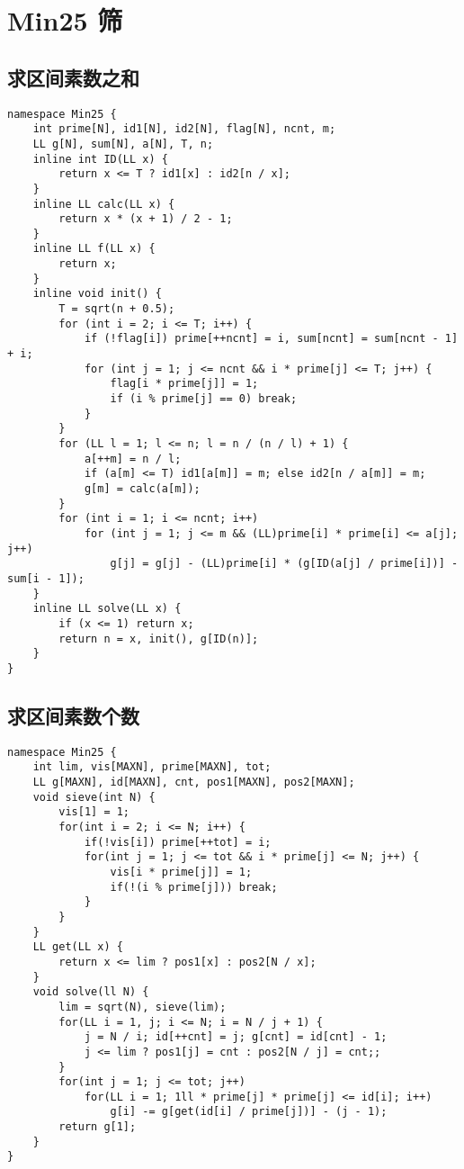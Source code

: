 \section{Min25 筛}

\subsection{求区间素数之和}
\begin{verbatim}
namespace Min25 {
    int prime[N], id1[N], id2[N], flag[N], ncnt, m;
    LL g[N], sum[N], a[N], T, n;
    inline int ID(LL x) {
        return x <= T ? id1[x] : id2[n / x];
    }
    inline LL calc(LL x) {
        return x * (x + 1) / 2 - 1;
    }
    inline LL f(LL x) {
        return x;
    }
    inline void init() {
        T = sqrt(n + 0.5);
        for (int i = 2; i <= T; i++) {
            if (!flag[i]) prime[++ncnt] = i, sum[ncnt] = sum[ncnt - 1] + i;
            for (int j = 1; j <= ncnt && i * prime[j] <= T; j++) {
                flag[i * prime[j]] = 1;
                if (i % prime[j] == 0) break;
            }
        }
        for (LL l = 1; l <= n; l = n / (n / l) + 1) {
            a[++m] = n / l;
            if (a[m] <= T) id1[a[m]] = m; else id2[n / a[m]] = m;
            g[m] = calc(a[m]);
        }
        for (int i = 1; i <= ncnt; i++) 
            for (int j = 1; j <= m && (LL)prime[i] * prime[i] <= a[j]; j++) 
                g[j] = g[j] - (LL)prime[i] * (g[ID(a[j] / prime[i])] - sum[i - 1]);
    }
    inline LL solve(LL x) {
        if (x <= 1) return x;
        return n = x, init(), g[ID(n)];
    }
}
\end{verbatim}

\subsection{求区间素数个数}
\begin{verbatim}
namespace Min25 {
    int lim, vis[MAXN], prime[MAXN], tot;
    LL g[MAXN], id[MAXN], cnt, pos1[MAXN], pos2[MAXN];
    void sieve(int N) {
        vis[1] = 1;
        for(int i = 2; i <= N; i++) {
            if(!vis[i]) prime[++tot] = i;
            for(int j = 1; j <= tot && i * prime[j] <= N; j++) {
                vis[i * prime[j]] = 1;
                if(!(i % prime[j])) break;
            }
        }
    }
    LL get(LL x) {
        return x <= lim ? pos1[x] : pos2[N / x];
    }
    void solve(ll N) {
        lim = sqrt(N), sieve(lim);
        for(LL i = 1, j; i <= N; i = N / j + 1) {
            j = N / i; id[++cnt] = j; g[cnt] = id[cnt] - 1;
            j <= lim ? pos1[j] = cnt : pos2[N / j] = cnt;;
        }
        for(int j = 1; j <= tot; j++) 
            for(LL i = 1; 1ll * prime[j] * prime[j] <= id[i]; i++) 
                g[i] -= g[get(id[i] / prime[j])] - (j - 1);
        return g[1];
    }
}
\end{verbatim}